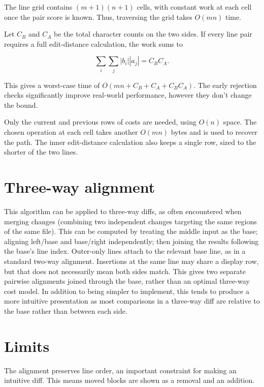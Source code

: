 \documentclass[
]{article}
\begin{document}
The line grid contains \((m+1)(n+1)\) cells, with constant work at each
cell once the pair score is known. Thus, traversing the grid takes
\(O(mn)\) time.

Let \(C_B\) and \(C_A\) be the total character counts on the two sides.
If every line pair requires a full edit-distance calculation, the work
sums to

\[\sum_i\sum_j |b_i||a_j|=C_BC_A.\]

This gives a worst-case time of \(O(mn+C_B+C_A+C_BC_A)\). The early
rejection checks significantly improve real-world performance, however
they don't change the bound.

Only the current and previous rows of costs are needed, using \(O(n)\)
space. The chosen operation at each cell takes another \(O(mn)\) bytes
and is used to recover the path. The inner edit-distance calculation
also keeps a single row, sized to the shorter of the two lines.

\hypertarget{three-way-alignment}{%
\section{Three-way alignment}\label{three-way-alignment}}

This algorithm can be applied to three-way diffs, as often encountered
when merging changes (combining two independent changes targeting the
same regions of the same file). This can be computed by treating the
middle input as the base; aligning left/base and base/right
independently; then joining the results following the base's line index.
Outer-only lines attach to the relevant base line, as in a standard
two-way alignment. Insertions at the same line may share a display row,
but that does not necessarily mean both sides match. This gives two
separate pairwise alignments joined through the base, rather than an
optimal three-way cost model. In addition to being simpler to implement,
this tends to produce a more intuitive presentation as most comparisons
in a three-way diff are relative to the base rather than between each
side.

\hypertarget{limits}{%
\section{Limits}\label{limits}}

The alignment preserves line order, an important constraint for making
an intuitive diff. This means moved blocks are shown as a removal and an
addition.
\end{document}
